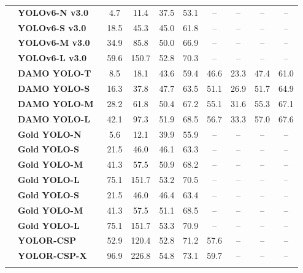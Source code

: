 \documentclass[10pt,twocolumn,letterpaper]{article}
\begin{document}
\begin{table}[h]
\begin{threeparttable}[t]
\begin{tabular}{l|lcccccccc}
				\midrule
				\multirow{12}{*}{\rotatebox{90}{\textbf{Knowledge Distillation}}} & \textbf{YOLOv6-N v3.0~\cite{li2023yolov6}} & 4.7 & 11.4 & 37.5 & 53.1 & -- & -- & -- & -- \\
				& \textbf{YOLOv6-S v3.0~\cite{li2023yolov6}} & 18.5 & 45.3 & 45.0 & 61.8 & -- & -- & -- & -- \\
				& \textbf{YOLOv6-M v3.0~\cite{li2023yolov6}} & 34.9 & 85.8 & 50.0 & 66.9 & -- & -- & -- & -- \\
				& \textbf{YOLOv6-L v3.0~\cite{li2023yolov6}} & 59.6 & 150.7 & 52.8 & 70.3 & -- & -- & -- & -- \\
				\cline{2-10}
				& \textbf{DAMO YOLO-T~\cite{xu2022damo}} & 8.5 & 18.1 & 43.6 & 59.4 & 46.6 & 23.3 & 47.4 & 61.0 \\
				& \textbf{DAMO YOLO-S~\cite{xu2022damo}} & 16.3 & 37.8 & 47.7 & 63.5 & 51.1 & 26.9 & 51.7 & 64.9 \\
				& \textbf{DAMO YOLO-M~\cite{xu2022damo}} & 28.2 & 61.8 & 50.4 & 67.2 & 55.1 & 31.6 & 55.3 & 67.1 \\
				& \textbf{DAMO YOLO-L~\cite{xu2022damo}} & 42.1 & 97.3 & 51.9 & 68.5 & 56.7 & 33.3 & 57.0 & 67.6 \\
				\cline{2-10}
				& \textbf{Gold YOLO-N~\cite{wang2023gold}} & 5.6 & 12.1 & 39.9 & 55.9 & -- & -- & -- & -- \\
				& \textbf{Gold YOLO-S~\cite{wang2023gold}} & 21.5 & 46.0 & 46.1 & 63.3 & -- & -- & -- & -- \\
				& \textbf{Gold YOLO-M~\cite{wang2023gold}} & 41.3 & 57.5 & 50.9 & 68.2 & -- & -- & -- & -- \\
				& \textbf{Gold YOLO-L~\cite{wang2023gold}} & 75.1 & 151.7 & 53.2 & 70.5 & -- & -- & -- & -- \\
				\midrule
				\multirow{10}{*}{\rotatebox{90}{\textbf{Complex Setting}}} & \textbf{Gold YOLO-S~\cite{wang2023gold}} & 21.5 & 46.0 & 46.4 & 63.4 & -- & -- & -- & -- \\
				& \textbf{Gold YOLO-M~\cite{wang2023gold}} & 41.3 & 57.5 & 51.1 & 68.5 & -- & -- & -- & -- \\
				& \textbf{Gold YOLO-L~\cite{wang2023gold}} & 75.1 & 151.7 & 53.3 & 70.9 & -- & -- & -- & -- \\
				\cline{2-10}				
				& \textbf{YOLOR-CSP~\cite{wang2021you}} & 52.9 & 120.4 & 52.8 & 71.2 & 57.6 & -- & -- & -- \\
				& \textbf{YOLOR-CSP-X~\cite{wang2021you}} & 96.9 & 226.8 & 54.8 & 73.1 & 59.7 &--  & -- & -- \\
				\cline{2-10}

\end{tabular}
\end{threeparttable}
\end{table}
\end{document}
